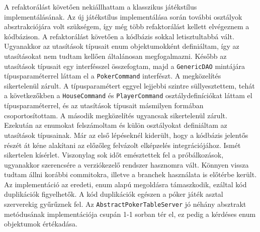 A refaktorálást követően nekiállhattam a klasszikus játékstílus implementálásának. Az új játékstílus implementálása során további osztályok absztrakciójára volt szükségem, így még több refaktorálást kellett elvégeznem a kódbázison. A refaktorálást követően a kódbázis sokkal letisztultabbá vált. Ugyanakkor az utasítások típusait enum objektumokként definiáltam, így az utasításokat nem tudtam kellően általánosan megfogalmazni. Később az utasítások típusait egy interfésszel összefogtam, majd a \texttt{GenericDAO} mintájára típusparaméterrel láttam el a \texttt{PokerCommand} interfészt. A megközelítés sikertelenül zárult. A típusparamétert eggyel lejjebbi szintre süllyesztettem, tehát a következőkben a \texttt{HouseCommand} és \texttt{PlayerCommand} osztálydefiníciókat láttam el típusparaméterrel, és az utasítások típusait másmilyen formában csoportosítottam. A második megközelítés ugyancsak sikertelenül zárult. Ezekután az enumokat felszámoltam és külön osztályokat definiáltam az utasítások típusainak. Már az első lépéseknél kiderült, hogy a kódbázis jelentős részét át kéne alakítani az előzőleg felvázolt elképzelés integrációjához. Ismét sikertelen kísérlet. Viszonylag sok időt emésztettek fel a próbálkozások, ugyanakkor szerencsére a verziókezelő rendszer hasznomra vált. Könnyen vissza tudtam állni korábbi commitokra, illetve a branchek használata is előtérbe került. \\
Az implementáció az eredeti, enum alapú megoldásra támaszkodik, ezáltal kód duplikációk figyelhetők. A kód duplikációk egészen a póker játék asztal szerverekig  gyűrűznek fel. Az \texttt{AbstractPokerTableServer} jó néhány absztrakt metódusának implementációja csupán 1-1 sorban tér el, ez pedig a kérdéses enum objektumok értékadása.

